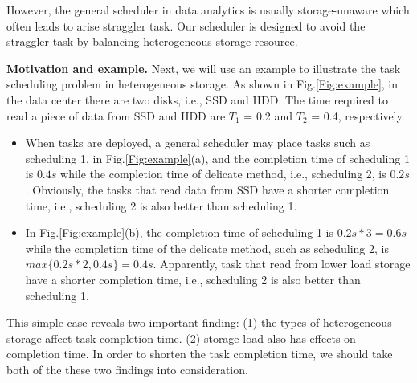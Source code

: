 \documentclass[conference]{IEEEtran}
\begin{document}
However, the general scheduler in data analytics is usually storage-unaware which often leads to arise straggler task. Our scheduler is designed to avoid the straggler task by balancing heterogeneous storage resource.

\textbf{Motivation and example.}
Next, we will use an example to illustrate the task scheduling problem in heterogeneous storage. As shown in Fig.\ref{Fig:example}, in the data center there are two disks, i.e., SSD and HDD. The time required to read a piece of data from SSD and HDD are $T_1$ = 0.2 and $T_2$ = 0.4, respectively. 
\begin{itemize}
	\item When tasks are deployed, a general scheduler may place tasks such as scheduling 1, in Fig.\ref{Fig:example}(a), and the completion time of scheduling 1 is $0.4s$ while the completion time of delicate method, i.e., scheduling 2, is $0.2s$. Obviously, the tasks that read data from SSD have a shorter completion time, i.e., scheduling 2 is also better than scheduling 1. 
	\item In Fig.\ref{Fig:example}(b), the completion time of scheduling 1 is $0.2s * 3 = 0.6s$ while the completion time of the delicate method, such as scheduling 2, is $max\{0.2s * 2, 0.4s\} = 0.4s$. Apparently, task that read from lower load storage have a shorter completion time, i.e., scheduling 2 is also better than scheduling 1.
\end{itemize}
This simple case reveals two important finding: (1) the types of heterogeneous storage affect task completion time. (2) storage load also has effects on completion time. In order to shorten the task completion time, we should take both of the these two findings into consideration.

\end{document}
